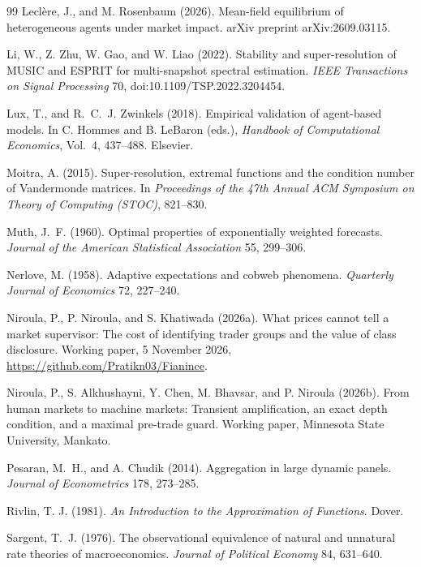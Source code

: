 \documentclass[12pt]{article}
\theoremstyle{definition}
\theoremstyle{remark}
\begin{document}
\begin{thebibliography}{99}
 Lecl\`ere, J., and M. Rosenbaum (2026). Mean-field equilibrium of heterogeneous agents under market impact. arXiv preprint arXiv:2609.03115.

 Li, W., Z. Zhu, W. Gao, and W. Liao (2022). Stability and super-resolution of MUSIC and ESPRIT for multi-snapshot spectral estimation. \emph{IEEE Transactions on Signal Processing} 70, doi:10.1109/TSP.2022.3204454.

 Lux, T., and R.~C.~J. Zwinkels (2018). Empirical validation of agent-based models. In C. Hommes and B. LeBaron (eds.), \emph{Handbook of Computational Economics}, Vol.~4, 437--488. Elsevier.

 Moitra, A. (2015). Super-resolution, extremal functions and the condition number of Vandermonde matrices. In \emph{Proceedings of the 47th Annual ACM Symposium on Theory of Computing (STOC)}, 821--830.

 Muth, J.~F. (1960). Optimal properties of exponentially weighted forecasts. \emph{Journal of the American Statistical Association} 55, 299--306.

 Nerlove, M. (1958). Adaptive expectations and cobweb phenomena. \emph{Quarterly Journal of Economics} 72, 227--240.

 Niroula, P., P. Niroula, and S. Khatiwada (2026a). What prices cannot tell a market supervisor: The cost of identifying trader groups and the value of class disclosure. Working paper, 5 November 2026, \url{https://github.com/Pratikn03/Fianince}.

 Niroula, P., S. Alkhushayni, Y. Chen, M. Bhavsar, and P. Niroula (2026b). From human markets to machine markets: Transient amplification, an exact depth condition, and a maximal pre-trade guard. Working paper, Minnesota State University, Mankato.

 Pesaran, M.~H., and A. Chudik (2014). Aggregation in large dynamic panels. \emph{Journal of Econometrics} 178, 273--285.

 Rivlin, T. J. (1981). \emph{An Introduction to the Approximation of Functions}. Dover.

 Sargent, T.~J. (1976). The observational equivalence of natural and unnatural rate theories of macroeconomics. \emph{Journal of Political Economy} 84, 631--640.


\end{thebibliography}
\end{document}
